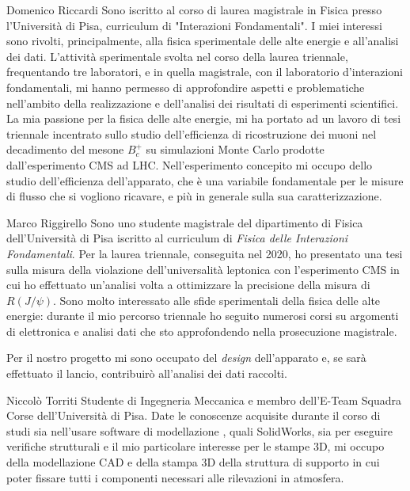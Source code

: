 \begin{crewbio}{Domenico Riccardi}
Sono iscritto al corso di laurea magistrale in Fisica presso l'Università di Pisa, curriculum di "Interazioni Fondamentali". I miei interessi sono rivolti, principalmente, alla fisica sperimentale delle alte energie e all'analisi dei dati. L'attività sperimentale svolta nel corso della laurea triennale, frequentando tre laboratori, e in quella magistrale, con il laboratorio d'interazioni fondamentali, mi hanno permesso di approfondire aspetti e problematiche nell'ambito della realizzazione e dell'analisi dei risultati di esperimenti scientifici. La mia passione per la fisica delle alte energie, mi ha portato ad un lavoro di tesi triennale incentrato sullo studio dell'efficienza di ricostruzione dei muoni nel decadimento del mesone $B_c^+$ su simulazioni Monte Carlo prodotte dall'esperimento CMS ad LHC. Nell'esperimento concepito mi occupo dello studio dell'efficienza dell'apparato, che è una variabile fondamentale per le misure di flusso che si vogliono ricavare, e più in generale sulla sua caratterizzazione.
\end{crewbio}

\begin{crewbio}{Marco Riggirello}
Sono uno studente magistrale del dipartimento di Fisica dell'Università di Pisa iscritto al curriculum di \emph{Fisica delle Interazioni Fondamentali}. Per la laurea triennale, conseguita nel 2020, ho presentato una tesi sulla misura della violazione dell'universalità leptonica con l'esperimento CMS in cui ho effettuato un'analisi volta a ottimizzare la precisione della misura di $R(J/\psi)$. Sono molto interessato alle sfide sperimentali della fisica delle alte energie: durante il mio percorso triennale ho seguito numerosi corsi su argomenti di elettronica e analisi dati che sto approfondendo nella prosecuzione magistrale. 

Per il nostro progetto mi sono occupato del \emph{design} dell'apparato e, se sarà effettuato il lancio, contribuir\`o all'analisi dei dati raccolti.
\end{crewbio}

\begin{crewbio}{Niccolò Torriti}
Studente di Ingegneria Meccanica e membro dell’E-Team Squadra Corse dell’Università di Pisa. Date le conoscenze acquisite durante il corso di studi sia nell’usare software di modellazione , quali SolidWorks, sia per eseguire verifiche strutturali e il mio particolare interesse per le stampe 3D, mi occupo della modellazione CAD e della stampa 3D della struttura di supporto in cui poter fissare tutti i componenti necessari alle rilevazioni in atmosfera.
\end{crewbio}

